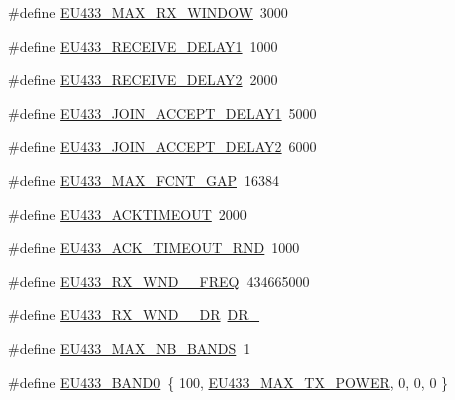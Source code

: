 \begin{DoxyCompactItemize}
\#define \mbox{\hyperlink{group___r_e_g_i_o_n_e_u433_ga2ea8a5b5b652197dc7f9ad1de0bd199b}{E\+U433\+\_\+\+M\+A\+X\+\_\+\+R\+X\+\_\+\+W\+I\+N\+D\+OW}}~3000
\item 
\#define \mbox{\hyperlink{group___r_e_g_i_o_n_e_u433_ga5280859658cfa8062200badd1c1cd469}{E\+U433\+\_\+\+R\+E\+C\+E\+I\+V\+E\+\_\+\+D\+E\+L\+A\+Y1}}~1000
\item 
\#define \mbox{\hyperlink{group___r_e_g_i_o_n_e_u433_ga305aa391ec1a9a008789076ebe87836d}{E\+U433\+\_\+\+R\+E\+C\+E\+I\+V\+E\+\_\+\+D\+E\+L\+A\+Y2}}~2000
\item 
\#define \mbox{\hyperlink{group___r_e_g_i_o_n_e_u433_ga88e1bced3e9f82375d0c5918c5bdeb62}{E\+U433\+\_\+\+J\+O\+I\+N\+\_\+\+A\+C\+C\+E\+P\+T\+\_\+\+D\+E\+L\+A\+Y1}}~5000
\item 
\#define \mbox{\hyperlink{group___r_e_g_i_o_n_e_u433_gab60dc1143d458c07ef3260a944ba0a7d}{E\+U433\+\_\+\+J\+O\+I\+N\+\_\+\+A\+C\+C\+E\+P\+T\+\_\+\+D\+E\+L\+A\+Y2}}~6000
\item 
\#define \mbox{\hyperlink{group___r_e_g_i_o_n_e_u433_ga5b7094c08ac59b66204c07232e25671f}{E\+U433\+\_\+\+M\+A\+X\+\_\+\+F\+C\+N\+T\+\_\+\+G\+AP}}~16384
\item 
\#define \mbox{\hyperlink{group___r_e_g_i_o_n_e_u433_gaa7d7d6a40fdb2b0a389a445ba851e39d}{E\+U433\+\_\+\+A\+C\+K\+T\+I\+M\+E\+O\+UT}}~2000
\item 
\#define \mbox{\hyperlink{group___r_e_g_i_o_n_e_u433_gaa23479e6b2fa5b07245baccf6bed20d3}{E\+U433\+\_\+\+A\+C\+K\+\_\+\+T\+I\+M\+E\+O\+U\+T\+\_\+\+R\+ND}}~1000
\item 
\#define \mbox{\hyperlink{group___r_e_g_i_o_n_e_u433_ga42387a283ba626367074fe6fdade4eb3}{E\+U433\+\_\+\+R\+X\+\_\+\+W\+N\+D\+\_\+\_\+\+F\+R\+EQ}}~434665000
\item 
\#define \mbox{\hyperlink{group___r_e_g_i_o_n_e_u433_ga723d6db9265caf8f5c24545137764c41}{E\+U433\+\_\+\+R\+X\+\_\+\+W\+N\+D\+\_\+\_\+\+DR}}~\mbox{\hyperlink{group___r_e_g_i_o_n_ga6c4ef966b4f3d5eb7597b087f2b97095}{D\+R\+\_}}
\item 
\#define \mbox{\hyperlink{group___r_e_g_i_o_n_e_u433_gaa45efc26cd18a760845f97a06f49bd9b}{E\+U433\+\_\+\+M\+A\+X\+\_\+\+N\+B\+\_\+\+B\+A\+N\+DS}}~1
\item 
\#define \mbox{\hyperlink{group___r_e_g_i_o_n_e_u433_gaf5112336b60d5977ad6afc600e5b0154}{E\+U433\+\_\+\+B\+A\+N\+D0}}~\{ 100, \mbox{\hyperlink{group___r_e_g_i_o_n_e_u433_gaac93ce9446f1e4b5c3c09c9b2ebf2297}{E\+U433\+\_\+\+M\+A\+X\+\_\+\+T\+X\+\_\+\+P\+O\+W\+ER}}, 0, 0, 0 \}
\item 

\end{DoxyCompactItemize}
